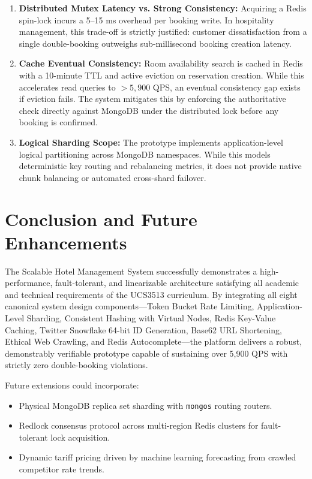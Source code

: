 \documentclass[11pt,a4paper]{article}
\begin{document}
\begin{enumerate}
    \item \textbf{Distributed Mutex Latency vs. Strong Consistency:} Acquiring a Redis spin-lock incurs a 5--15 ms overhead per booking write. In hospitality management, this trade-off is strictly justified: customer dissatisfaction from a single double-booking outweighs sub-millisecond booking creation latency.
    \item \textbf{Cache Eventual Consistency:} Room availability search is cached in Redis with a 10-minute TTL and active eviction on reservation creation. While this accelerates read queries to $>5,900$ QPS, an eventual consistency gap exists if eviction fails. The system mitigates this by enforcing the authoritative check directly against MongoDB under the distributed lock before any booking is confirmed.
    \item \textbf{Logical Sharding Scope:} The prototype implements application-level logical partitioning across MongoDB namespaces. While this models deterministic key routing and rebalancing metrics, it does not provide native chunk balancing or automated cross-shard failover.
\end{enumerate}

\section{Conclusion and Future Enhancements}

The Scalable Hotel Management System successfully demonstrates a high-performance, fault-tolerant, and linearizable architecture satisfying all academic and technical requirements of the UCS3513 curriculum. By integrating all eight canonical system design components—Token Bucket Rate Limiting, Application-Level Sharding, Consistent Hashing with Virtual Nodes, Redis Key-Value Caching, Twitter Snowflake 64-bit ID Generation, Base62 URL Shortening, Ethical Web Crawling, and Redis Autocomplete—the platform delivers a robust, demonstrably verifiable prototype capable of sustaining over 5,900 QPS with strictly zero double-booking violations.

Future extensions could incorporate:
\begin{itemize}
    \item Physical MongoDB replica set sharding with \texttt{mongos} routing routers.
    \item Redlock consensus protocol across multi-region Redis clusters for fault-tolerant lock acquisition.
    \item Dynamic tariff pricing driven by machine learning forecasting from crawled competitor rate trends.
\end{itemize}
\end{document}
